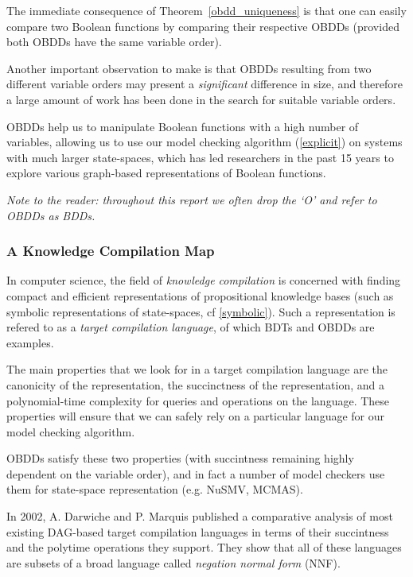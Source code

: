 \documentclass[11pt]{article}
\begin{document}
The immediate consequence of Theorem~\ref{obdd_uniqueness} is that one can easily compare two Boolean functions by comparing their respective OBDDs (provided both OBDDs have the same variable order). 

Another important observation to make is that OBDDs resulting from two different variable orders may present a \textit{significant }difference in size, and therefore a large amount of work has been done in the search for suitable variable orders. 

OBDDs help us to manipulate Boolean functions with a high number of variables, allowing us to use our model checking algorithm (\ref{explicit}) on systems with much larger state-spaces, which has led researchers in the past 15 years to explore various graph-based representations of Boolean functions.

\noindent\textit{Note to the reader: throughout this report we often drop the `O' and refer to OBDDs as BDDs.}

\subsubsection{A Knowledge Compilation Map}

In computer science, the field of \textit{knowledge compilation} is concerned with finding compact and efficient representations of propositional knowledge bases (such as symbolic representations of state-spaces, cf \ref{symbolic}).
 Such a representation is refered to as a \textit{target compilation language}, of which BDTs and OBDDs are examples. 
 
 The main properties that we look for in a target compilation language are the canonicity of the representation, the succinctness of the representation, and a polynomial-time complexity for queries and operations on the language. 
 These properties will ensure that we can safely rely on a particular language for our model checking algorithm. 
 
 OBDDs satisfy these two properties (with succintness remaining highly dependent on the variable order), and in fact a number of model checkers use them for state-space representation (e.g. NuSMV, MCMAS). 
 
 In 2002, A. Darwiche and P. Marquis published \cite{compilation_map} a comparative analysis of most existing DAG-based target compilation languages in terms of their succintness and the polytime operations they support. They show that all of these languages are subsets of a broad language called \textit{negation normal form} (NNF). 
\end{document}
